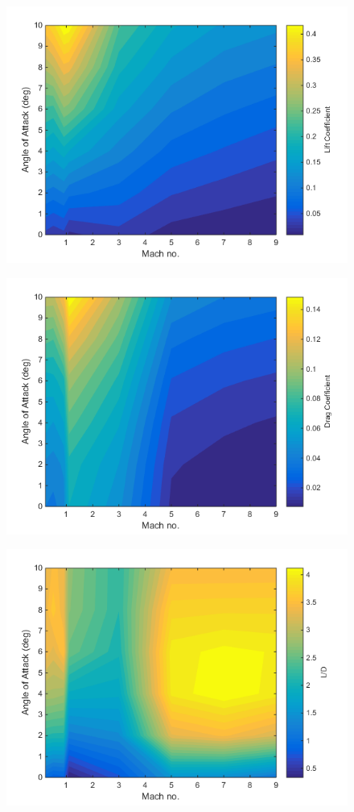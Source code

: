 \begin{figure}
\centering
\includegraphics[width=0.7\linewidth]{figures/3_vehicle_design/Cl}
\caption{}
\label{fig:Cl}
\end{figure}
\begin{figure}
\centering
\includegraphics[width=0.7\linewidth]{figures/3_vehicle_design/Cd}
\caption{}
\label{fig:Cd}
\end{figure}
\begin{figure}
\centering
\includegraphics[width=0.7\linewidth]{figures/3_vehicle_design/LD}
\caption{}
\label{fig:LD}
\end{figure}

